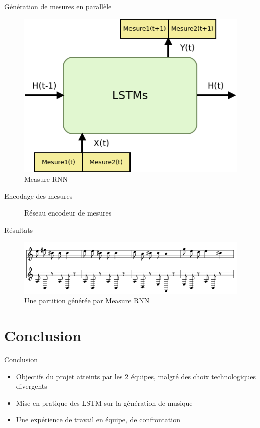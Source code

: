 \documentclass{beamer}
\begin{document}
\begin{frame}{Génération de mesures en parallèle}
\begin{figure}
\begin{center}
\includegraphics[scale=0.5]{images/measure_rnn.png}
\caption{Measure RNN}
\end{center}
\end{figure}
\end{frame}

\begin{frame}{Encodage des mesures}
\begin{figure}
\begin{center}

\caption{Réseau encodeur de mesures}
\end{center}
\end{figure}
\end{frame}

\begin{frame}{Résultats}
\begin{figure}
\begin{center}
\includegraphics[scale=0.3]{images/measure_rnn_result.png}
\caption{Une partition générée par Measure RNN}
\end{center}
\end{figure}
\end{frame}

\section{Conclusion}


\begin{frame}{Conclusion}
  \begin{itemize}
    \item Objectifs du projet atteints par les 2 équipes, malgré des choix technologiques divergents
    \item Mise en pratique des LSTM sur la génération de musique
    \item Une expérience de travail en équipe, de confrontation
  \end{itemize}
\end{frame}
\end{document}
